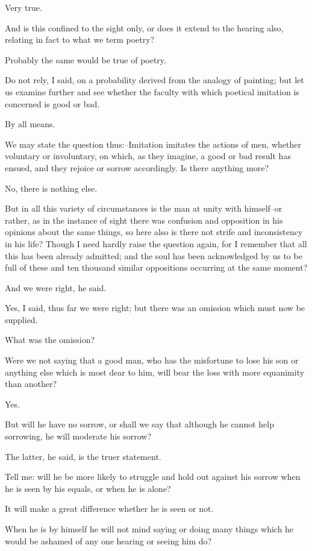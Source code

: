 Very true.

And is this confined to the sight only, or does it extend to the hearing
also, relating in fact to what we term poetry?

Probably the same would be true of poetry.

Do not rely, I said, on a probability derived from the analogy of
painting; but let us examine further and see whether the faculty with
which poetical imitation is concerned is good or bad.

By all means.

We may state the question thus:--Imitation imitates the actions of men,
whether voluntary or involuntary, on which, as they imagine, a good or
bad result has ensued, and they rejoice or sorrow accordingly. Is there
anything more?

No, there is nothing else.

But in all this variety of circumstances is the man at unity with
himself--or rather, as in the instance of sight there was confusion and
opposition in his opinions about the same things, so here also is there
not strife and inconsistency in his life? Though I need hardly raise the
question again, for I remember that all this has been already admitted;
and the soul has been acknowledged by us to be full of these and ten
thousand similar oppositions occurring at the same moment?

And we were right, he said.

Yes, I said, thus far we were right; but there was an omission which
must now be supplied.

What was the omission?

Were we not saying that a good man, who has the misfortune to lose his
son or anything else which is most dear to him, will bear the loss with
more equanimity than another?

Yes.

But will he have no sorrow, or shall we say that although he cannot help
sorrowing, he will moderate his sorrow?

The latter, he said, is the truer statement.

Tell me: will he be more likely to struggle and hold out against his
sorrow when he is seen by his equals, or when he is alone?

It will make a great difference whether he is seen or not.

When he is by himself he will not mind saying or doing many things which
he would be ashamed of any one hearing or seeing him do?

